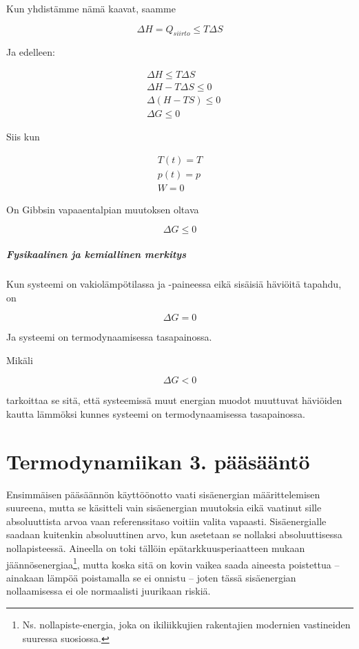 \documentclass[12pt,a4paper,finnish]{book}
\begin{document}
Kun yhdistämme nämä kaavat, saamme

\begin{equation}
 \Delta H = Q_{siirto} \leq T\Delta S
\end{equation}

Ja edelleen: 

\begin{align}
 & \Delta H \leq T\Delta S\\
 & \Delta H - T\Delta S \leq 0\\
 & \Delta(H - TS) \leq 0\\
 & \Delta G \leq 0
\end{align}

Siis kun

\begin{align}
 T(t) = T\\
 p(t) = p\\
 W = 0
\end{align}

On Gibbsin vapaaentalpian muutoksen oltava

\begin{equation}
 \Delta G \leq 0
\end{equation}

\paragraph{Fysikaalinen ja kemiallinen merkitys}

Kun systeemi on vakiolämpötilassa ja -paineessa eikä sisäisiä häviöitä tapahdu, on 

\begin{equation}
 \Delta G = 0
\end{equation}

Ja systeemi on termodynaamisessa tasapainossa.

Mikäli

\begin{equation}
 \Delta G < 0
\end{equation}

tarkoittaa se sitä, että systeemissä muut energian muodot muuttuvat häviöiden kautta lämmöksi 
kunnes systeemi on termodynaamisessa tasapainossa.

\chapter{Termodynamiikan 3. pääsääntö} %

Ensimmäisen pääsäännön käyttöönotto vaati sisäenergian määrittelemisen suureena, mutta se käsitteli vain 
sisäenergian muutoksia eikä vaatinut sille absoluuttista arvoa vaan referenssitaso voitiin valita 
vapaasti. Sisäenergialle saadaan kuitenkin absoluuttinen arvo, kun asetetaan se nollaksi 
absoluuttisessa nollapisteessä. Aineella on toki tällöin epätarkkuusperiaatteen mukaan 
jäännösenergiaa\footnote{Ns. nollapiste-energia, joka on ikiliikkujien rakentajien modernien vastineiden 
suuressa suosiossa.}, mutta koska sitä on kovin vaikea saada aineesta poistettua -- ainakaan lämpöä 
poistamalla se ei onnistu -- joten tässä sisäenergian nollaamisessa ei ole normaalisti juurikaan riskiä.
\end{document}
